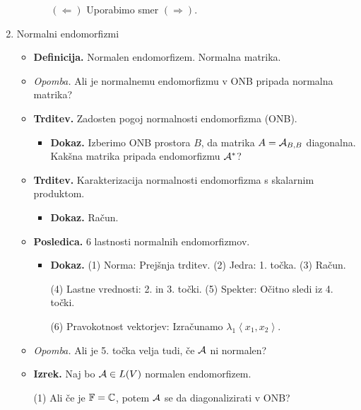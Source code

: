 \begin{enumerate}
\begin{itemize}
\begin{itemize}
            $(\Leftarrow)$ Uporabimo smer $(\Rightarrow)$.
        \end{itemize}
    \end{itemize}
    \item Normalni endomorfizmi
    \begin{itemize}
        \item \colorbox{purple!30}{\textbf{Definicija.}} Normalen endomorfizem. Normalna matrika.
        \item \colorbox{yellow!30}{\emph{Opomba.}} Ali je normalnemu endomorfizmu v ONB pripada normalna matrika?
        \item \colorbox{blue!30}{\textbf{Trditev.}} Zadosten pogoj normalnosti endomorfizma (ONB).
        \begin{itemize}
            \item \colorbox{green!30}{\textbf{Dokaz.}} Izberimo ONB prostora $B$, da matrika $A = \mathcal{A}_{B,B}$ diagonalna. Kakšna matrika pripada endomorfizmu $\mathcal{A}^*$?
        \end{itemize}
        \item \colorbox{blue!30}{\textbf{Trditev.}} Karakterizacija normalnosti endomorfizma s skalarnim produktom.
        \begin{itemize}
            \item \colorbox{green!30}{\textbf{Dokaz.}} Račun.
        \end{itemize}
        \item \colorbox{orange!30}{\textbf{Posledica.}} 6 lastnosti normalnih endomorfizmov.
        \begin{itemize}
            \item \colorbox{green!30}{\textbf{Dokaz.}} (1) Norma: Prejšnja trditev.            
            (2) Jedra: 1. točka.
            (3) Račun.
            
            (4) Lastne vrednosti: 2. in 3. točki.
            (5) Spekter: Očitno sledi iz 4. točki.
            
            (6) Pravokotnost vektorjev: Izračunamo $\lambda_1 \left\langle x_1, x_2 \right\rangle$.
        \end{itemize}
        \item \colorbox{yellow!30}{\emph{Opomba.}} Ali je 5. točka velja tudi, če $\mathcal{A}$ ni normalen?
        \item \colorbox{blue!30}{\textbf{Izrek.}} Naj bo $\mathcal{A} \in L(V)$ normalen endomorfizem.
        
        (1) Ali če je $\mathbb{F} = \mathbb{C}$, potem $\mathcal{A}$ se da diagonalizirati v ONB?


\end{itemize}
\end{enumerate}
